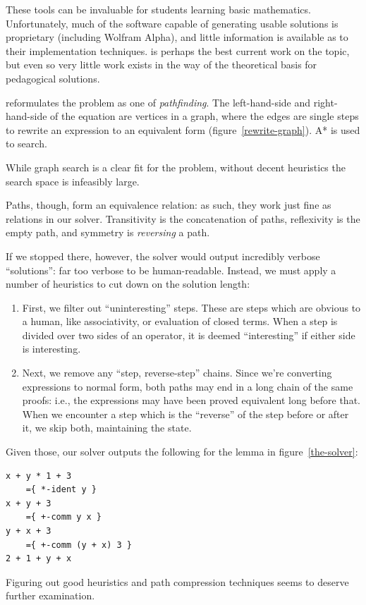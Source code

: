 \documentclass[draft, twocolumn]{article}
\theoremstyle{definition}
\theoremstyle{definition}
\begin{document}
These tools can be invaluable for students learning basic mathematics.
Unfortunately, much of the software capable of generating usable solutions is
proprietary (including Wolfram Alpha), and little information is available as to
their implementation techniques.\cite{lioubartsev_constructing_2016} is perhaps
the best current work on the topic, but even so very little work exists in the
way of the theoretical basis for pedagogical solutions.

\cite{lioubartsev_constructing_2016} reformulates the problem as one of
\emph{pathfinding}. The left-hand-side and right-hand-side of the equation are
vertices in a graph, where the edges are single steps to rewrite an expression
to an equivalent form (figure~\ref{rewrite-graph}). A* is used to search.

While graph search is a clear fit for the problem, without decent heuristics the
search space is infeasibly large.

Paths, though, form an equivalence relation: as such, they work just fine as
relations in our solver. Transitivity is the concatenation of paths, reflexivity
is the empty path, and symmetry is \emph{reversing} a path.

If we stopped there, however, the solver would output incredibly verbose
``solutions'': far too verbose to be human-readable. Instead, we must apply a
number of heuristics to cut down on the solution length:

\begin{enumerate}
  \item First, we filter out ``uninteresting'' steps. These are steps which are
    obvious to a human, like associativity, or evaluation of closed terms. When
    a step is divided over two sides of an operator, it is deemed
    ``interesting'' if either side is interesting.
  \item Next, we remove any ``step, reverse-step'' chains. Since we're
    converting expressions to normal form, both paths may end in a long chain of
    the same proofs: i.e., the expressions may have been proved equivalent long
    before that. When we encounter a step which is the ``reverse'' of the step
    before or after it, we skip both, maintaining the state.
\end{enumerate}

Given those, our solver outputs the following for the lemma in
figure~\ref{the-solver}:
\begin{verbatim}
x + y * 1 + 3
    ={ *-ident y }
x + y + 3
    ={ +-comm y x }
y + x + 3
    ={ +-comm (y + x) 3 }
2 + 1 + y + x
\end{verbatim}
Figuring out good heuristics and path compression techniques seems to deserve
further examination.
\end{document}
